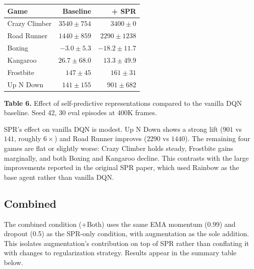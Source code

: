 \documentclass[11pt]{article}
\begin{document}
\begin{table}[h]
\centering
\renewcommand{\arraystretch}{1.4}
\setlength{\tabcolsep}{12pt}
\begin{tabular}{l r r}
\toprule
\textbf{Game} & \textbf{Baseline} & \textbf{+ SPR} \\
\midrule
Crazy Climber  & $3540 \pm 754$   & $3400 \pm 0$ \\
Road Runner    & $1440 \pm 859$   & $2290 \pm 1238$ \\
Boxing         & $-3.0 \pm 5.3$   & $-18.2 \pm 11.7$ \\
Kangaroo       & $26.7 \pm 68.0$  & $13.3 \pm 49.9$ \\
Frostbite      & $147 \pm 45$     & $161 \pm 31$ \\
Up N Down      & $141 \pm 155$    & $901 \pm 682$ \\
\bottomrule
\end{tabular}

\vspace{1.2em}
{\raggedright\small \textbf{Table 6.} Effect of self-predictive
representations compared to the vanilla DQN baseline. Seed 42, 30 eval
episodes at 400K frames.\par}
\end{table}

\noindent SPR's effect on vanilla DQN is modest. Up N Down shows a
strong lift ($901$ vs $141$, roughly $6\times$) and Road Runner
improves ($2290$ vs $1440$). The remaining four games are flat or
slightly worse: Crazy Climber holds steady, Frostbite gains marginally,
and both Boxing and Kangaroo decline. This contrasts with the large
improvements reported in the original SPR paper, which used Rainbow as
the base agent rather than vanilla DQN.

\subsection{Combined}

\noindent The combined condition (+Both) uses the same EMA momentum
(0.99) and dropout (0.5) as the SPR-only condition, with augmentation
as the sole addition. This isolates augmentation's contribution on top
of SPR rather than conflating it with changes to regularization
strategy. Results appear in the summary table below.
\end{document}
